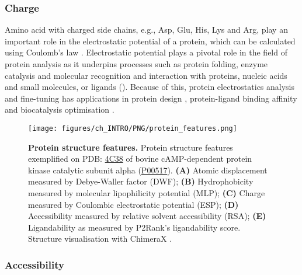 \subsubsection{Charge}

Amino acid with charged side chains, e.g., Asp, Glu, His, Lys and Arg, play an important role in the electrostatic potential of a protein, which can be calculated using Coulomb's law \cite{COULOMB_1785_LAW}. Electrostatic potential plays a pivotal role in the field of protein analysis as it underpins processes such as protein folding, enzyme catalysis and molecular recognition and interaction with proteins, nucleic acids and small molecules, or ligands \cite{ZHOU_2018_ESP} (). Because of this, protein electrostatics analysis and fine-tuning has applications in protein design \cite{GORHAM_2011_ESP}, protein-ligand binding affinity \cite{KUKIC_2010_ELECTROSTATICS} and biocatalysis optimisation \cite{VASCON_2020_ESP}.

\begin{figure}[htb!]
    \centering
    \texttt{[image: figures/ch\_INTRO/PNG/protein\_features.png]}
    \caption[Protein structure features]{\textbf{Protein structure features.} Protein structure features exemplified on PDB: \href{https://www.ebi.ac.uk/pdbe/entry/pdb/4c38}{4C38} \cite{COUTY_2013_ONCO} of bovine cAMP-dependent protein kinase catalytic subunit alpha (\href{https://www.uniprot.org/uniprotkb/P00517/entry}{P00517}). \textbf{(A)} Atomic displacement measured by Debye-Waller factor (DWF); \textbf{(B)} Hydrophobicity measured by molecular lipophilicity potential (MLP); \textbf{(C)} Charge measured by Coulombic electrostatic potential (ESP); \textbf{(D)} Accessibility measured by relative solvent accessibility (RSA); \textbf{(E)} Ligandability as measured by P2Rank's ligandability score. Structure visualisation with ChimeraX \cite{PETTERSEN_2021_CHIMERAX}.}
    \label{fig:protein_features}
\end{figure}

\subsubsection{Accessibility}


